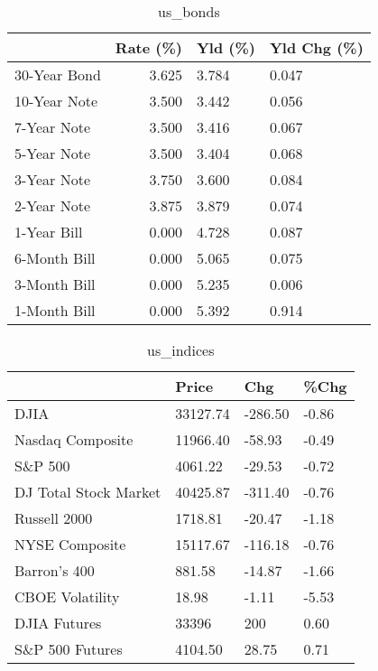 \documentclass{article}%
\begin{document}
%


\begin{table}[htbp]%
\caption{us\_bonds}%
\centering%
\begin{adjustbox}{width=1\textwidth}%
\begin{tabular}{lrll}
\toprule
             &  Rate (\%) & Yld (\%) & Yld Chg (\%) \\
\midrule
30-Year Bond &     3.625 &   3.784 &       0.047 \\
10-Year Note &     3.500 &   3.442 &       0.056 \\
 7-Year Note &     3.500 &   3.416 &       0.067 \\
 5-Year Note &     3.500 &   3.404 &       0.068 \\
 3-Year Note &     3.750 &   3.600 &       0.084 \\
 2-Year Note &     3.875 &   3.879 &       0.074 \\
 1-Year Bill &     0.000 &   4.728 &       0.087 \\
6-Month Bill &     0.000 &   5.065 &       0.075 \\
3-Month Bill &     0.000 &   5.235 &       0.006 \\
1-Month Bill &     0.000 &   5.392 &       0.914 \\
\bottomrule
\end{tabular}
%
\end{adjustbox}%
\end{table}

%


\begin{table}[htbp]%
\caption{us\_indices}%
\centering%
\begin{adjustbox}{width=1\textwidth}%
\begin{tabular}{llll}
\toprule
                      &    Price &     Chg &  \%Chg \\
\midrule
                 DJIA & 33127.74 & -286.50 & -0.86 \\
     Nasdaq Composite & 11966.40 &  -58.93 & -0.49 \\
              S\&P 500 &  4061.22 &  -29.53 & -0.72 \\
DJ Total Stock Market & 40425.87 & -311.40 & -0.76 \\
         Russell 2000 &  1718.81 &  -20.47 & -1.18 \\
       NYSE Composite & 15117.67 & -116.18 & -0.76 \\
         Barron's 400 &   881.58 &  -14.87 & -1.66 \\
      CBOE Volatility &    18.98 &   -1.11 & -5.53 \\
         DJIA Futures &    33396 &     200 &  0.60 \\
      S\&P 500 Futures &  4104.50 &   28.75 &  0.71 \\
\bottomrule
\end{tabular}
%
\end{adjustbox}%
\end{table}
\end{document}
